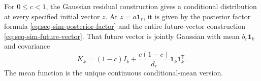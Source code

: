 \begin{proposition}
\label{seqp:conditioning}
For \(0\leq c<1\), the Gaussian residual construction gives a conditional
distribution at every specified initial vector \(z\). At
\(z=a\mathbf1_r\), it is given by the posterior factor formula
\eqref{eq:seq-sim-posterior-factor} and the entire future-vector
construction \eqref{eq:seq-sim-future-vector}. That future vector is jointly
Gaussian with mean
\(b_r\mathbf1_k\) and covariance
\begin{equation}
 K_k=(1-c)I_k+\frac{c(1-c)}{d_r}\mathbf1_k\mathbf1_k^{\mathsf T}.
 \label{eq:seq-complete-conditional-covariance}
\end{equation}
The mean function is the unique continuous conditional-mean version.
\end{proposition}

